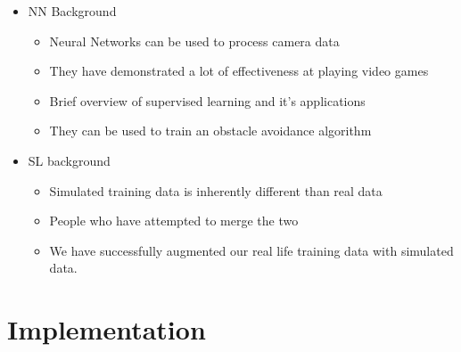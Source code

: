 \documentclass[paper=a4, fontsize=11pt]{scrartcl} %
\begin{document}
\begin{itemize}
	\item  NN Background
	\begin{itemize}
		\item Neural Networks can be used to process camera data
		\item They have demonstrated a lot of effectiveness at playing video games
		\item Brief overview of supervised learning and it's applications
		\item They can be used to train an obstacle avoidance algorithm
	\end{itemize}
\end{itemize}

\begin{itemize}
	\item SL background
	\begin{itemize}
		\item Simulated training data is inherently different than real data
		\item People who have attempted to merge the two
		\item We have successfully augmented our real life training data with simulated data.
	\end{itemize}
\end{itemize}

\section{Implementation}
\end{document}
